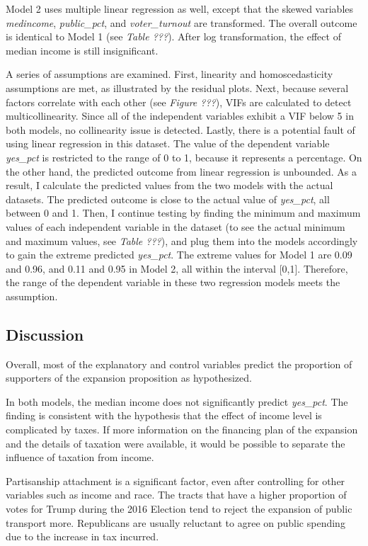 \documentclass[
]{article}
\begin{document}
Model 2 uses multiple linear regression as well, except that the skewed
variables \emph{medincome}, \emph{public\_pct}, and
\emph{voter\_turnout} are transformed. The overall outcome is identical
to Model 1 (see \emph{Table ???}). After log transformation, the effect
of median income is still insignificant.

A series of assumptions are examined. First, linearity and
homoscedasticity assumptions are met, as illustrated by the residual
plots. Next, because several factors correlate with each other (see
\emph{Figure ???}), VIFs are calculated to detect multicollinearity.
Since all of the independent variables exhibit a VIF below 5 in both
models, no collinearity issue is detected. Lastly, there is a potential
fault of using linear regression in this dataset. The value of the
dependent variable \emph{yes\_pct} is restricted to the range of 0 to 1,
because it represents a percentage. On the other hand, the predicted
outcome from linear regression is unbounded. As a result, I calculate
the predicted values from the two models with the actual datasets. The
predicted outcome is close to the actual value of \emph{yes\_pct}, all
between 0 and 1. Then, I continue testing by finding the minimum and
maximum values of each independent variable in the dataset (to see the
actual minimum and maximum values, see \emph{Table ???}), and plug them
into the models accordingly to gain the extreme predicted
\emph{yes\_pct}. The extreme values for Model 1 are 0.09 and 0.96, and
0.11 and 0.95 in Model 2, all within the interval {[}0,1{]}. Therefore,
the range of the dependent variable in these two regression models meets
the assumption.

\hypertarget{discussion}{%
\subsection{Discussion}\label{discussion}}

Overall, most of the explanatory and control variables predict the
proportion of supporters of the expansion proposition as hypothesized.

In both models, the median income does not significantly predict
\emph{yes\_pct}. The finding is consistent with the hypothesis that the
effect of income level is complicated by taxes. If more information on
the financing plan of the expansion and the details of taxation were
available, it would be possible to separate the influence of taxation
from income.

Partisanship attachment is a significant factor, even after controlling
for other variables such as income and race. The tracts that have a
higher proportion of votes for Trump during the 2016 Election tend to
reject the expansion of public transport more. Republicans are usually
reluctant to agree on public spending due to the increase in tax
incurred.
\end{document}
